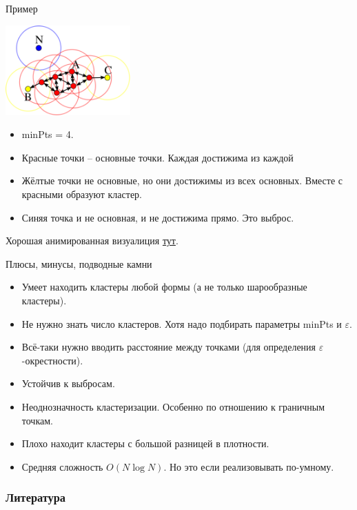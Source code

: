 \documentclass[9pt]{beamer}
\begin{document}
\begin{frame}{Пример}
\begin{center}\includegraphics[height=130px]{img/dbscan.png}\end{center}
\begin{itemize}
    \item minPts = 4.
    \item Красные точки -- основные точки. Каждая достижима из каждой
    \item Жёлтые точки не основные, но они достижимы из всех основных. Вместе с красными образуют кластер.
    \item Синяя точка и не основная, и не достижима прямо. Это выброс.
\end{itemize}
Хорошая анимированная визуалиция \href{https://www.naftaliharris.com/blog/visualizing-dbscan-clustering/}{тут}.
\end{frame}

\begin{frame}{Плюсы, минусы, подводные камни}
\begin{itemize}
    \item Умеет находить кластеры любой формы (а не только шарообразные кластеры).
    \item Не нужно знать число кластеров. Хотя надо подбирать параметры minPts и $\varepsilon$.
    \item Всё-таки нужно вводить расстояние между точками (для определения $\varepsilon$-окрестности).
    \item Устойчив к выбросам.
    \item Неоднозначность кластеризации. Особенно по отношению к граничным точкам.
    \item Плохо находит кластеры с большой разницей в плотности.
    \item Средняя сложность $O(N \log N)$. Но это если реализовывать по-умному.
\end{itemize}
    
\end{frame}

\begin{frame}[allowframebreaks]
    \frametitle{Литература}
    
    \nocite{esl}
    \nocite{dbscan_wiki}
    \nocite{dbscan_habr}
    \nocite{dbscan_visualization}
    
\end{frame}
\end{document}
